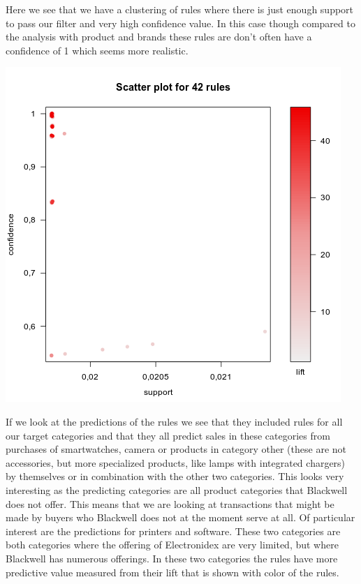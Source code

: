 \documentclass[12pt,a4paper,leqno]{report}
\theoremstyle{plain}
\theoremstyle{definition}
\theoremstyle{remark}
\begin{document}
Here we see that we have a clustering of rules where there is just enough support to pass
our filter and very high confidence value. In this case though compared to the analysis with
product and brands these rules are don't often have a confidence of 1 which seems more
realistic.

\bigskip
{
    \centering
    \includegraphics[width=\textwidth,height=\textheight,keepaspectratio]{apriori_product_category_level_plot.png}
    \par
}
\bigskip

If we look at the predictions of the rules we see that they included rules for all our target
categories and that they all predict sales in these categories from purchases of smartwatches, camera
or products in category other (these are not accessories, but more specialized products, like lamps with
integrated chargers) by themselves or in combination with the other two categories. This looks very interesting
as the predicting categories are all product categories that Blackwell does not offer. This means that we
are looking at transactions that might be made by buyers who Blackwell does not at the moment serve at all.
Of particular interest are the predictions for printers and software. These two categories are both categories
where the offering of Electronidex are very limited, but where Blackwell has numerous offerings. In these two
categories the rules have more predictive value measured from their lift that is shown with
color of the rules.
\end{document}
